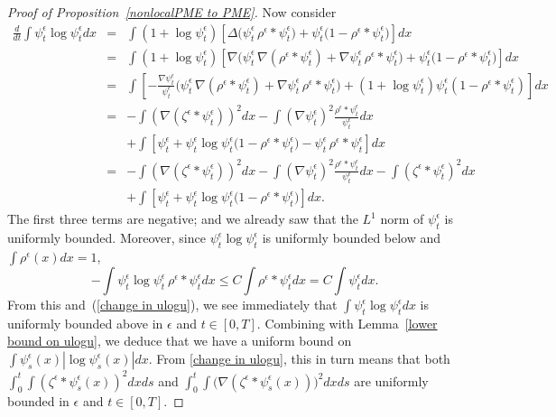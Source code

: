 \documentclass[EJP]{ejpecp} %
\begin{document}
\begin{proof}[Proof of Proposition~\ref{nonlocalPME to PME}]
Now consider
\begin{eqnarray}
	\frac{d}{dt}\int \psi_t^\epsilon\log \psi_t^\epsilon dx &=&
	\int (1+\log \psi_t^\epsilon)\left[\Delta \big(\psi_t^\epsilon\,
	\rho^{\epsilon}*\psi_t^\epsilon\big)
	+\psi_t^\epsilon\big(1-\rho^{\epsilon}*\psi_t^\epsilon\big)\right]
dx
\nonumber
\\
&=&
	\int (1+\log \psi_t^\epsilon)\left[\nabla\Big(\psi_t^\epsilon\,
	\nabla(\rho^{\epsilon}*\psi_t^\epsilon)+
	\nabla \psi_t^\epsilon\, \rho^{\epsilon}*\psi_t^\epsilon\Big)
	+\psi_t^\epsilon\big(1-\rho^{\epsilon}*\psi_t^\epsilon\big)\right]  dx
\nonumber
	\\
&=&
\int \left[-\frac{\nabla \psi_t^\epsilon}{\psi_t^\epsilon}
\Big(\psi_t^\epsilon\, \nabla(\rho^{\epsilon}*\psi_t^\epsilon)
+\nabla \psi_t^\epsilon\, \rho^{\epsilon}*\psi_t^\epsilon\Big)+
(1+\log \psi_t^\epsilon)\psi_t^\epsilon(1-\rho^{\epsilon}*\psi_t^\epsilon)\right] d x
\nonumber
	\\
&=&
-\int \left(\nabla (\zeta^{\epsilon}*\psi_t^\epsilon)\right)^2  dx
-\int (\nabla \psi_t^\epsilon)^2\frac{\rho^{\epsilon}*\psi_t^\epsilon}{\psi_t^\epsilon}  dx
\nonumber
	\\
&&+\int
\left[\psi_t^\epsilon+\psi_t^\epsilon\log \psi_t^\epsilon
\big(1-\rho^{\epsilon}*\psi_t^\epsilon\big)
-\psi_t^\epsilon\, \rho^{\epsilon}*\psi_t^\epsilon\right] dx
\nonumber
	\\
&=&
-\int \left(\nabla (\zeta^{\epsilon}*\psi_t^\epsilon)\right)^2  dx
-\int (\nabla \psi_t^\epsilon)^2\frac{\rho^{\epsilon}*\psi_t^\epsilon}{\psi_t^\epsilon} dx
-\int (\zeta^{\epsilon}*\psi_t^\epsilon)^2  dx
\nonumber
	\\
&&+\int
\left[\psi_t^\epsilon+\psi_t^\epsilon\log \psi_t^\epsilon
\big(1-\rho^{\epsilon}*\psi_t^\epsilon\big)
\right] dx .
	\label{change in ulogu}
\end{eqnarray}
The first three terms are negative; and we already
saw that the $L^1$ norm
of $\psi_t^\epsilon$ is uniformly bounded.
%
Moreover, since $\psi_t^\epsilon\log \psi_t^\epsilon$ is uniformly bounded below
and $\int \rho^\epsilon(x) dx = 1$,
$$
    -\int \psi_t^\epsilon \log \psi_t^\epsilon \, \rho^{\epsilon}*\psi_t^\epsilon dx
    \leq
    C\int \rho^{\epsilon}*\psi_t^\epsilon dx
    =
    C \int \psi_t^\epsilon dx.
$$
From this and~(\ref{change in ulogu}),
we see immediately that $\int \psi_t^\epsilon \log \psi_t^\epsilon dx$
is uniformly bounded
above in $\epsilon$ and $t\in [0,T]$. 
Combining with Lemma~\ref{lower bound on ulogu},
we deduce that
we have a uniform bound on $\int \psi_s^\epsilon(x)|\log \psi_s^\epsilon(x)| d x$.
From \eqref{change in ulogu}, this in turn means that both
$\int_0^t \int(\zeta^{\epsilon}*\psi_s^\epsilon(x))^2  dx ds$ and
$\int_0^t \int \big(\nabla (\zeta^{\epsilon}*\psi_s^\epsilon(x))\big)^2  dx ds$
are uniformly bounded in
$\epsilon$ and $t\in [0,T]$.


\end{proof}
\end{document}
